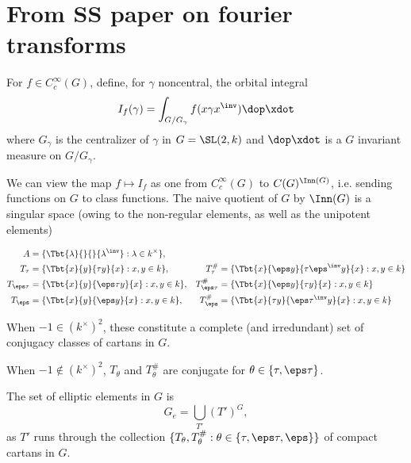 \section{From SS paper on fourier transforms}
For $f \in C_c^\infty(G)$, define, for $\gamma$ noncentral, the orbital integral 
	\[I_f (\gamma) = \int _{G/G_\gamma} f(x \gamma x^\inv) \dop \xdot \]
where $G_\gamma$ is the centralizer of $\gamma$ in $G=\SL(2,k)$ and $\dop \xdot$ is a $G$ invariant measure on $G/G_\gamma$. 

We can view the map $f\mapsto I_{f}$ as one from $C_c^\infty (G)$ to $C(G)^{\Inn(G)}$, i.e. sending functions on $G$ to class functions. The naive quotient of $G$ by $\Inn(G)$ is a singular space (owing to the non-regular elements, as well as the unipotent elements) 

\begin{align*}
	A &= \{ \Tbt{\lambda}{}{}{\lambda^\inv} : \lambda \in k^\times \}, & 	&	  \\
	T_\tau &= \{\Tbt{x}{y}{\tau y}{x} : x,y \in k\},  & T^\# _\tau &= \{\Tbt{x}{\eps y}{\tau \eps^\inv y}{x} : x,y \in k\} \\
	T_{\eps \tau} &= \{\Tbt{x}{y}{ \eps \tau y}{x} : x,y \in k\}, & T^\# _{\eps \tau} &= \{\Tbt{x}{\eps y}{\tau y}{x} : x,y \in k\}\\
	T_{\eps} &= \{\Tbt{x}{y}{ \eps y}{x} : x,y \in k\},  & T^\# _{\eps} &= \{\Tbt{x}{\tau y}{\eps \tau^\inv y}{x} : x,y \in k\}
\end{align*}

When $-1 \in (k^\times)^2$, these constitute a complete (and irredundant) set of conjugacy classes of cartans in $G$. 

When $-1 \notin (k^\times) ^2$, $T_\theta$ and $T_\theta^\#$ are conjugate for $\theta \in \{ \tau, \eps \tau\}$. 

The set of elliptic elements in $G$ is 
\[
	G_e = \bigcup_{T'} (T')^G,
\]
as $T'$ runs through the collection $\{ T_\theta, T^\#_\theta : \theta \in \{\tau,\eps \tau, \eps \}\}$ of compact cartans in $G$. 
